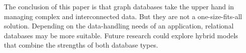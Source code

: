 The conclusion of this paper is that graph databases take the upper hand in managing complex and interconnected data. But they are not a one-size-fits-all solution. Depending on the data-handling needs of an application, relational databases may be more suitable. Future research could explore hybrid models that combine the strengths of both database types. 
